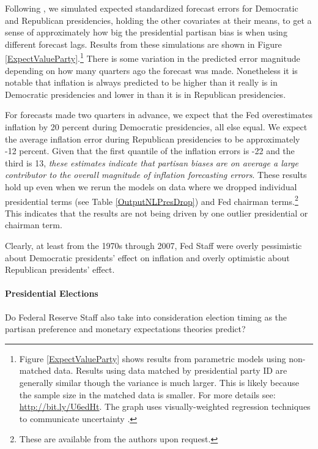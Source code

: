 \documentclass[a4paper]{article}\usepackage{graphicx, color}
\begin{document}
Following \cite{King2000}, we simulated expected standardized forecast errors for Democratic and Republican presidencies, holding the other covariates at their means, to get a sense of approximately how big the presidential partisan bias is when using different forecast lags. Results from these simulations are shown in Figure \ref{ExpectValueParty}.\footnote{Figure \ref{ExpectValueParty} shows results from parametric models using non-matched data.  Results using data matched by presidential party ID are generally similar though the variance is much larger. This is likely because the sample size in the matched data is smaller. For more details see: \url{http://bit.ly/U6edHt}. The graph uses visually-weighted regression techniques to communicate uncertainty \citep[see][]{Hsiang2012,Gandrud2013visual}.} There is some variation in the predicted error magnitude depending on how many quarters ago the forecast was made. Nonetheless it is notable that inflation is always predicted to be higher than it really is in Democratic presidencies and lower in than it is in Republican presidencies.

For forecasts made two quarters in advance, we expect that the Fed overestimates inflation by 20 percent during Democratic presidencies, all else equal. We expect the average inflation error during Republican presidencies to be approximately -12 percent. Given that the first quantile of the inflation errors is -22 and the third is 13, \emph{these estimates indicate that partisan biases are on average a large contributor to the overall magnitude of inflation forecasting errors}. These results hold up even when we rerun the models on data where we dropped individual presidential terms (see Table \ref{OutputNLPresDrop}) and Fed chairman terms.\footnote{These are available from the authors upon request.} This indicates that the results are not being driven by one outlier presidential or chairman term.

Clearly, at least from the 1970s through 2007, Fed Staff were overly pessimistic about Democratic presidents' effect on inflation and overly optimistic about Republican presidents' effect. 

\paragraph{Presidential Elections}

Do Federal Reserve Staff also take into consideration election timing as the partisan preference and monetary expectations theories predict? 
\end{document}
